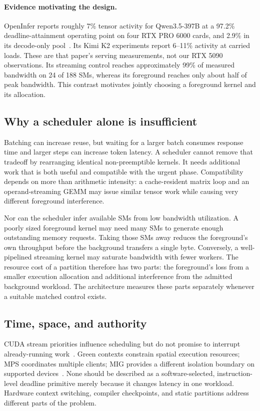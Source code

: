 \paragraph{Evidence motivating the design.}
OpenInfer reports roughly 7\% tensor activity for Qwen3.5-397B at a
97.2\% deadline-attainment operating point on four RTX PRO 6000 cards,
and 2.9\% in its decode-only pool~\cite{Nourai2026GPUOS}. Its Kimi K2
experiments report 6--11\% activity at carried loads. These are that paper's
serving measurements, not our RTX 5090 observations. Its streaming control
reaches approximately 99\% of measured bandwidth on 24 of 188 SMs, whereas
its foreground reaches only about half of peak bandwidth. This contrast
motivates jointly choosing a foreground kernel and its allocation.

\subsection{Why a scheduler alone is insufficient}
Batching can increase reuse, but waiting for a larger batch consumes response
time and larger steps can increase token latency. A scheduler cannot remove
that tradeoff by rearranging identical non-preemptible kernels. It needs
additional work that is both useful and compatible with the urgent phase.
Compatibility depends on more than arithmetic intensity: a cache-resident
matrix loop and an operand-streaming GEMM may issue similar tensor work while
causing very different foreground interference.

Nor can the scheduler infer available SMs from low bandwidth utilization.
A poorly sized foreground kernel may need many SMs to generate enough
outstanding memory requests. Taking those SMs away reduces the foreground's
own throughput before the background transfers a single byte. Conversely,
a well-pipelined streaming kernel may saturate bandwidth with fewer workers.
The resource cost of a partition therefore has two parts: the foreground's
loss from a smaller execution allocation and additional interference from
the admitted background workload. The architecture measures these parts
separately whenever a suitable matched control exists.

\subsection{Time, space, and authority}
CUDA stream priorities influence scheduling but do not promise to interrupt
already-running work~\cite{CUDAStreams}. Green contexts constrain spatial
execution resources; MPS coordinates multiple clients; MIG provides a
different isolation boundary on supported devices~\cite{CUDAGreen,NVIDIAMPS}.
None should be described as a software-selected, instruction-level deadline
primitive merely because it changes latency in one workload. Hardware
context switching, compiler checkpoints, and static partitions address
different parts of the problem.

